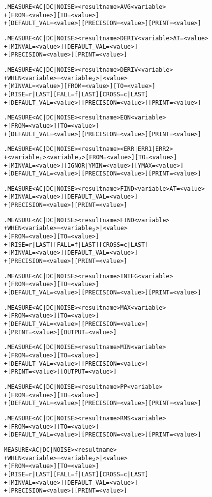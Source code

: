 \begin{Command}
\begin{alltt}
.MEASURE <AC|DC|NOISE> <result name> AVG <variable>
+ [FROM=<value>] [TO=<value>]
+ [DEFAULT_VAL=<value>] [PRECISION=<value>] [PRINT=<value>]

.MEASURE <AC|DC|NOISE> <result name> DERIV <variable> AT=<value>
+ [MINVAL=<value>] [DEFAULT_VAL=<value>]
+ [PRECISION=<value>] [PRINT=<value>]

.MEASURE <AC|DC|NOISE> <result name> DERIV <variable>
+ WHEN <variable>=<variable\(\sb{2}\)>|<value>
+ [MINVAL=<value>] [FROM=<value>] [TO=<value>]
+ [RISE=r|LAST] [FALL=f|LAST] [CROSS=c|LAST]
+ [DEFAULT_VAL=<value>] [PRECISION=<value>] [PRINT=<value>]

.MEASURE <AC|DC|NOISE> <result name> EQN <variable>
+ [FROM=<value>] [TO=<value>] 
+ [DEFAULT_VAL=<value>] [PRECISION=<value>] [PRINT=<value>]

.MEASURE <AC|DC|NOISE> <result name> <ERR|ERR1|ERR2>
+ <variable\(\sb{1}\)> <variable\(\sb{2}\)> [FROM=<value>] [TO=<value>]
+ [MINVAL=<value>] [IGNOR|YMIN=<value>] [YMAX=<value>]
+ [DEFAULT_VAL=<value>] [PRECISION=<value>] [PRINT=<value>]

.MEASURE <AC|DC|NOISE> <result name> FIND <variable> AT=<value>
+ [MINVAL=<value>] [DEFAULT_VAL=<value>]
+ [PRECISION=<value>] [PRINT=<value>]

.MEASURE <AC|DC|NOISE> <result name> FIND <variable>
+ WHEN <variable>=<variable\(\sb{2}\)>|<value>
+ [FROM=<value>] [TO=<value>]
+ [RISE=r|LAST] [FALL=f|LAST] [CROSS=c|LAST]
+ [MINVAL=<value>] [DEFAULT_VAL=<value>]
+ [PRECISION=<value>] [PRINT=<value>]

.MEASURE <AC|DC|NOISE> <result name> INTEG <variable>
+ [FROM=<value>] [TO=<value>]
+ [DEFAULT_VAL=<value>] [PRECISION=<value>] [PRINT=<value>]

.MEASURE <AC|DC|NOISE> <result name> MAX <variable>
+ [FROM=<value>] [TO=<value>] 
+ [DEFAULT_VAL=<value>] [PRECISION=<value>] 
+ [PRINT=<value>] [OUTPUT=<value>]

.MEASURE <AC|DC|NOISE> <result name> MIN <variable>
+ [FROM=<value>] [TO=<value>] 
+ [DEFAULT_VAL=<value>] [PRECISION=<value>]
+ [PRINT=<value>] [OUTPUT=<value>]

.MEASURE <AC|DC|NOISE> <result name> PP <variable>
+ [FROM=<value>] [TO=<value>] 
+ [DEFAULT_VAL=<value>] [PRECISION=<value>] [PRINT=<value>]

.MEASURE <AC|DC|NOISE> <result name> RMS <variable>
+ [FROM=<value>] [TO=<value>]
+ [DEFAULT_VAL=<value>] [PRECISION=<value>] [PRINT=<value>]

MEASURE <AC|DC|NOISE> <result name>
+ WHEN <variable>=<variable\(\sb{2}\)>|<value>
+ [FROM=<value>] [TO=<value>]
+ [RISE=r|LAST] [FALL=f|LAST] [CROSS=c|LAST]
+ [MINVAL=<value>] [DEFAULT_VAL=<value>]
+ [PRECISION=<value>] [PRINT=<value>]


\end{alltt}
\end{Command}
